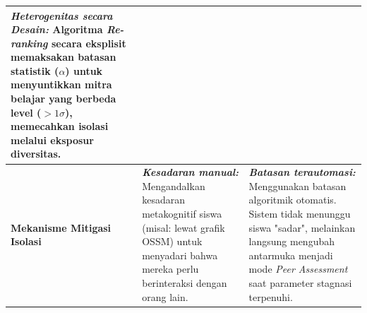 \begin{table}[!ht]
\begin{tabular}{|p{}|p{}|p{}|}
        \textbf{\textit{Heterogenitas secara Desain:}} \newline
        Algoritma \textit{Re-ranking} secara eksplisit memaksakan batasan statistik ($\alpha$) untuk menyuntikkan mitra belajar yang berbeda level ($>1\sigma$), memecahkan isolasi melalui eksposur diversitas. \\
        \hline
        \textbf{Mekanisme Mitigasi Isolasi} & 
        \textbf{\textit{Kesadaran manual:}} \newline
        Mengandalkan kesadaran metakognitif siswa (misal: lewat grafik OSSM) untuk menyadari bahwa mereka perlu berinteraksi dengan orang lain. & 
        \textbf{\textit{Batasan terautomasi:}} \newline
        Menggunakan batasan algoritmik otomatis. Sistem tidak menunggu siswa "sadar", melainkan langsung mengubah antarmuka menjadi mode \textit{Peer Assessment} saat parameter stagnasi terpenuhi. \\
        \hline
    \end{tabular}
\end{table}